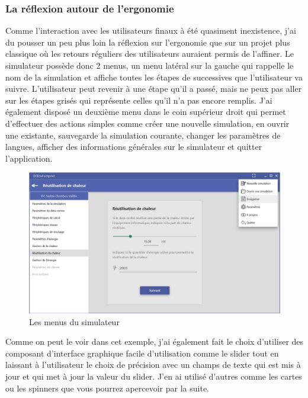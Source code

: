 \subsubsection{La réflexion autour de l'ergonomie}
Comme l'interaction avec les utilisateurs finaux à été quasiment inexistence, j'ai du pousser un peu plus loin la réflexion sur l'ergonomie que sur un projet plus classique où les retours réguliers des utilisateurs auraient permis de l'affiner. Le simulateur possède donc 2 menus, un menu latéral sur la gauche qui rappelle le nom de la simulation et affiche toutes les étapes de successives que l'utilisateur va suivre. L'utilisateur peut revenir à une étape qu'il a passé, mais ne peux pas aller sur les étapes grisés qui représente celles qu'il n'a pas encore remplis. J'ai également disposé un deuxième menu dans le coin supérieur droit qui permet d'effectuer des actions simples comme créer une nouvelle simulation, en ouvrir une existante, sauvegarde la simulation courante, changer les paramètres de  langues, afficher des informations générales sur le simulateur et quitter l'application.

\begin{figure}[h]
	\begin{center}
		\includegraphics[scale=0.40]{partie2/images/ergonomie1.png}
		\caption{Les menus du simulateur}
	\end{center}
\end{figure}

Comme on peut le voir dans cet exemple, j'ai également fait le choix d'utiliser des composant d'interface graphique facile d'utilisation comme le slider tout en laissant à l'utilisateur le choix de précision avec un champs de texte qui est mis à jour et qui met à jour la valeur du slider. J'en ai utilisé d'autres comme les cartes ou les spinners que vous pourrez apercevoir par la suite.

